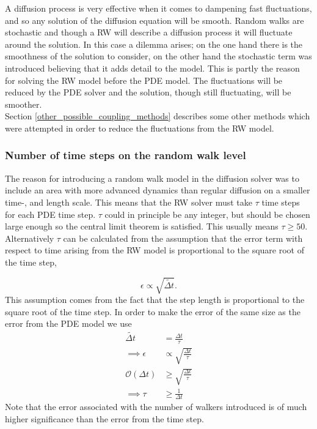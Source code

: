  A diffusion process is very effective when it comes to dampening fast fluctuations, and so any solution of the diffusion equation will be smooth. 
 Random walks are stochastic and though a RW will describe a diffusion process it will fluctuate around the solution. 
 In this case a dilemma arises; on the one hand there is the smoothness of the solution to consider, on the other hand the stochastic term was introduced believing that it adds detail to the model. 
This is partly the reason for solving the RW model before the PDE model. 
The fluctuations will be reduced by the PDE solver and the solution, though still fluctuating, will be smoother. \\

Section \ref{other_possible_coupling_methods} describes some other methods which were attempted in order to reduce the fluctuations from the RW model.

\subsubsection{Number of time steps on the random walk level}
The reason for introducing a random walk model in the diffusion solver was to include an area with more advanced dynamics than regular diffusion on a smaller time-, and length scale. 
This means that the RW solver must take $\tau$ time steps for each PDE time step. 
$\tau$ could in principle be any integer, but should be chosen large enough so the central limit theorem is satisfied. 
This usually means $\tau\geq50$. \\
Alternatively $\tau$ can be calculated from the assumption that the error term with respect to time arising from the RW model is proportional to the square root of the time step, 

\begin{equation}
 \epsilon \propto \sqrt{\tilde{\Delta t}}.
\end{equation}
This assumption comes from the fact that the step length is proportional to the square root of the time step.
In order to make the error of the same size as the error from the PDE model we use 
\begin{align*}
 \tilde{\Delta t} &= \frac{\Delta t}{\tau} \\
 \implies \epsilon &\propto \sqrt{\frac{\Delta t}{\tau}} \\
 \mathcal{O}(\Delta t) &\geq \sqrt{\frac{\Delta t}{\tau}} \\
 \implies \tau &\geq \frac{1}{\Delta t}
\end{align*}
\noindent Note that the error associated with the number of walkers introduced is of much higher significance than the error from the time step.

